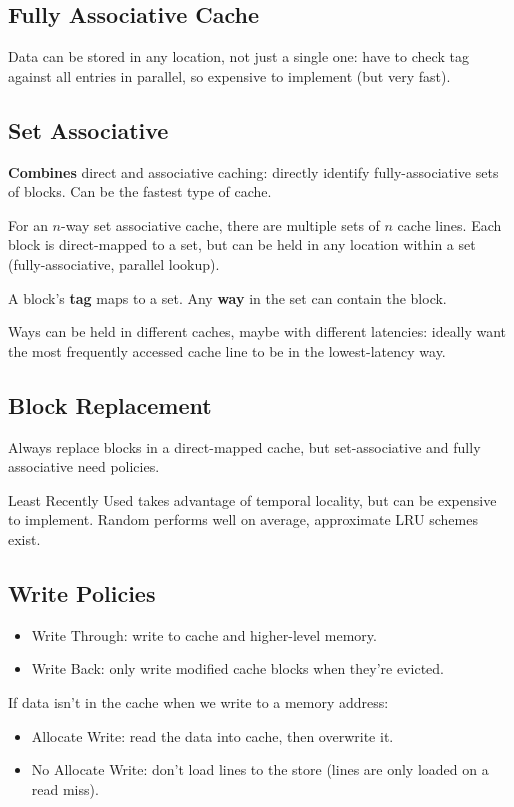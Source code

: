 \documentclass[a4paper, 11pt]{article}
\begin{document}
{    \subsection*{Fully Associative Cache}
    {
        Data can be stored in any location, not just a single one: have to check tag against all entries in parallel, so expensive to implement (but very fast).
    }
    \subsection*{Set Associative}
    {
        \textbf{Combines} direct and associative caching: directly identify fully-associative sets of blocks. Can be the fastest type of cache.

        For an \(n\)-way set associative cache, there are multiple sets of \(n\) cache lines. Each block is direct-mapped to a set, but can be held in any location within a set (fully-associative, parallel lookup).

        A block's \textbf{tag} maps to a set. Any \textbf{way} in the set can contain the block.

        Ways can be held in different caches, maybe with different latencies: ideally want the most frequently accessed cache line to be in the lowest-latency way.
    }
    \subsection*{Block Replacement}
    {
        Always replace blocks in a direct-mapped cache, but set-associative and fully associative need policies.

        Least Recently Used takes advantage of temporal locality, but can be expensive to implement. Random performs well on average, approximate LRU schemes exist.
    }
    \subsection*{Write Policies}
    {
        \begin{itemize}
        \item Write Through: write to cache and higher-level memory.
        \item Write Back: only write modified cache blocks when they're evicted.
        \end{itemize}

        If data isn't in the cache when we write to a memory address:
        \begin{itemize}
        \item Allocate Write: read the data into cache, then overwrite it.
        \item No Allocate Write: don't load lines to the store (lines are only loaded on a read miss).
        \end{itemize}

}}
\end{document}
